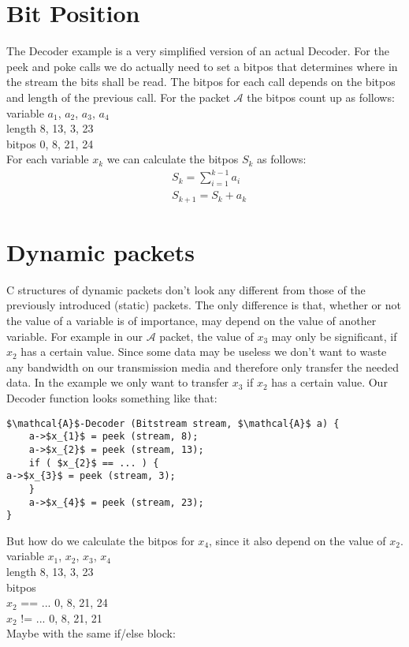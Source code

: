 \documentclass[paper=a4,DIV=12]{scrartcl}
\begin{document}
\section{Bit Position}

The Decoder example is a very simplified version of an actual Decoder.
For the peek and poke calls we do actually need to set a bitpos
that determines where in the stream the bits shall be read.
The bitpos for each call depends on the bitpos and length of the previous call.
For the packet $\mathcal{A}$ the bitpos count up as follows:\\
variable   $a_{1}$, $a_{2}$, $a_{3}$, $a_{4}$\\
length      8, 13,  3, 23\\
bitpos      0,  8, 21, 24\\
For each variable $x_{k}$ we can calculate the bitpos $S_{k}$ as follows:
\begin{align*}
	&S_{k} = \sum_{i=1}^{k-1} a_{i}\\
	&S_{k+1} = S_{k} + a_{k}
\end{align*}

\section{Dynamic packets}

C structures of dynamic packets don't look any different from those of the previously introduced (static) packets.
The only difference is that, whether or not the value of a variable is of importance, may depend on the value of another variable.	
For example in our $\mathcal{A}$ packet, the value of $x_{3}$ may only be significant, if $x_{2}$ has a certain value.
Since some data may be useless we don't want to waste any bandwidth on our transmission media and therefore only transfer the needed data.
In the example we only want to transfer $x_{3}$ if $x_{2}$ has a certain value.
Our Decoder function looks something like that:

\begin{lstlisting}[mathescape]
$\mathcal{A}$-Decoder (Bitstream stream, $\mathcal{A}$ a) {
	a->$x_{1}$ = peek (stream, 8);
	a->$x_{2}$ = peek (stream, 13);
	if ( $x_{2}$ == ... ) {
a->$x_{3}$ = peek (stream, 3);
	}
	a->$x_{4}$ = peek (stream, 23);
}
\end{lstlisting}

But how do we calculate the bitpos for $x_{4}$, since it also depend on the value of $x_{2}$.\\
variable   $x_{1}$, $x_{2}$, $x_{3}$, $x_{4}$\\
length        8, 13, 3, 23\\
bitpos\\
$x_{2}$ == ...  0, 8, 21, 24\\
$x_{2}$ != ...  0, 8, 21, 21\\
Maybe with the same if/else block:
\end{document}
